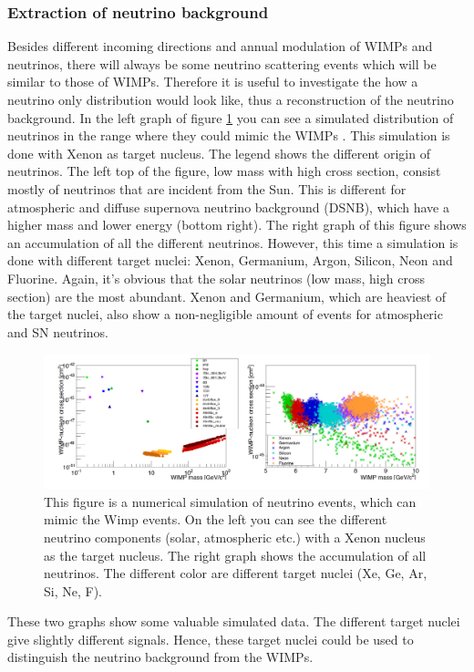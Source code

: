 \documentclass{article}
\begin{document}
\FloatBarrier
\subsubsection{Extraction of neutrino background}
Besides different incoming directions and annual modulation of WIMPs and neutrinos, there will always be some neutrino scattering events which will be similar to those of WIMPs. Therefore it is useful to investigate the how a neutrino only distribution would look like, thus a reconstruction of the neutrino background. In the left graph of figure \ref{Neutrino Background} you can see a simulated distribution of neutrinos in the range where they could mimic the WIMPs \cite{Billard:2013qya}. This simulation is done with Xenon as target nucleus. The legend shows the different origin of neutrinos. The left top of the figure, low mass with high cross section, consist mostly of neutrinos that are incident from the Sun. This is different for atmospheric and diffuse supernova neutrino background (DSNB), which have a higher mass and lower energy (bottom right).
The right graph of this figure shows an accumulation of all the different neutrinos. However, this time a simulation is done with different target nuclei: Xenon, Germanium, Argon, Silicon, Neon and Fluorine. Again, it's obvious that the solar neutrinos (low mass, high cross section) are the most abundant. Xenon and Germanium, which are heaviest of the target nuclei, also show a non-negligible amount of events for atmospheric and SN neutrinos. 

\begin{figure}[h]
    \centering
    \includegraphics[width=\textwidth]{Neutrinos3.png}
    \caption{This figure is a numerical simulation of neutrino events, which can mimic the Wimp events. On the left you can see the different neutrino components (solar, atmospheric etc.) with a Xenon nucleus as the target nucleus. The right graph shows the accumulation of all neutrinos. The different color are different target nuclei (Xe, Ge, Ar, Si, Ne, F).  \cite{Billard:2013qya}}
    \label{Neutrino Background}
\end{figure}

These two graphs show some valuable simulated data. The different target nuclei give slightly different signals. Hence, these target nuclei could be used to distinguish the neutrino background from the WIMPs.


\FloatBarrier

\
\newpage


\end{document}

